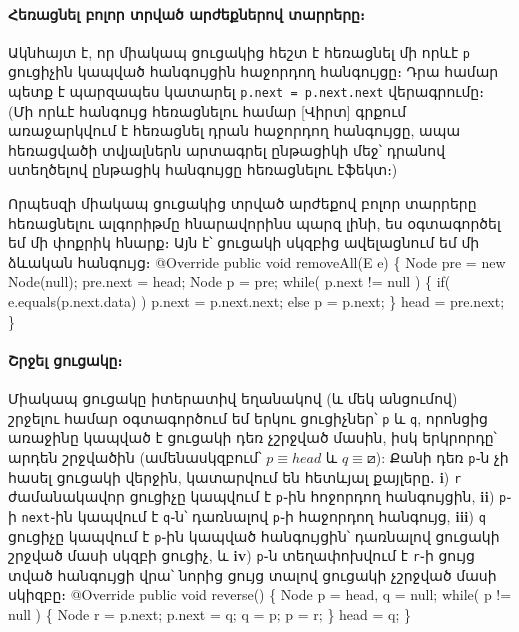 %
%
\paragraph{Հեռացնել բոլոր տրված արժեքներով տարրերը։}
Ակնհայտ է, որ միակապ ցուցակից հեշտ է հեռացնել մի որևէ \texttt{p}
ցուցիչին կապված հանգույցին հաջորդող հանգույցը։ Դրա համար պետք է
պարզապես կատարել \texttt{p.next = p.next.next} վերագրումը։
(Մի որևէ հանգույց հեռացնելու համար [Վիրտ] գրքում առաջարկվում է
հեռացնել դրան հաջորդող հանգույցը, ապա հեռացվածի տվյալներն 
արտագրել ընթացիկի մեջ՝ դրանով ստեղծելով ընթացիկ հանգույցը 
հեռացնելու էֆեկտ։)

\medskip
{\par}
\medskip

Որպեսզի միակապ ցուցակից տրված արժեքով բոլոր տարրերը հեռացնելու 
ալգորիթմը հնարավորինս պարզ լինի, ես օգտագործել եմ մի փոքրիկ 
հնարք։ Այն է՝ ցուցակի սկզբից ավելացնում եմ մի ձևական հանգույց։
\nwenddocs{}\endmoddef{}
@Override
public void removeAll(E e)
\{
  Node pre = new Node(null);
  pre.next = head;
  Node p = pre;
  while( p.next != null ) \{
    if( e.equals(p.next.data) )
      p.next = p.next.next;
    else
      p = p.next;
  \}
  head = pre.next;
\}
\nwendcode{}\nwdocspar

%
%
\paragraph{Շրջել ցուցակը։}
Միակապ ցուցակը իտերատիվ եղանակով (և մեկ անցումով) շրջելու համար 
օգտագործում եմ երկու ցուցիչներ՝ \texttt{p} և \texttt{q}, որոնցից
առաջինը կապված է ցուցակի դեռ չշրջված մասին, իսկ երկրորդը՝ արդեն 
շրջվածին (ամենասկզբում՝ \(p\equiv head\) և \(q\equiv\boxslash\)): 
Քանի դեռ \texttt{p}֊ն չի հասել ցուցակի վերջին, կատարվում են 
հետևյալ քայլերը․ \textbf{i}) \texttt{r} ժամանակավոր ցուցիչը կապվում 
է \texttt{p}֊ին հոջորդող հանգույցին, \textbf{ii}) \texttt{p}֊ի 
\texttt{next}֊ին կապվում է \texttt{q}֊ն՝ դառնալով \texttt{p}֊ի 
հաջորդող հանգույց, \textbf{iii}) \texttt{q} ցուցիչը կապվում է
\texttt{p}֊ին կապված հանգույցին՝ դառնալով ցուցակի շրջված մասի 
սկզբի ցուցիչ, և \textbf{iv}) \texttt{p}֊ն տեղափոխվում է \texttt{r}֊ի
ցույց տված հանգույցի վրա՝ նորից ցույց տալով ցուցակի չշրջված մասի 
սկիզբը։
\nwenddocs{}\endmoddef{}
@Override
public void reverse()
\{
  Node p = head, q = null;
  while( p != null ) \{
    Node r = p.next;
    p.next = q;
    q = p;
    p = r;
  \}
  head = q;
\}
\nwendcode{}\nwdocspar

